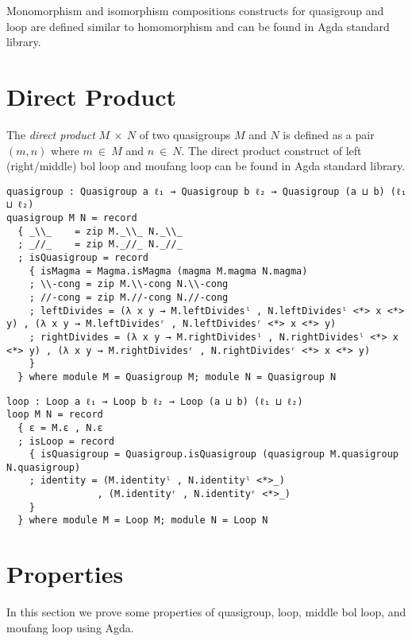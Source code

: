 Monomorphism and isomorphism compositions constructs for quasigroup and loop are
defined similar to homomorphism and can be found in Agda standard library.

\section{Direct Product}
The \textit{direct product} $M \ \times \ N$ of two quasigroups $M$ and $N$ is
defined as a pair $(m,n)$ where $m \ \in \ M$ and $n \ \in \ N$. The direct
product construct of left (right/middle) bol loop and moufang loop can be found
in Agda standard library.
\begin{verbatim}
quasigroup : Quasigroup a ℓ₁ → Quasigroup b ℓ₂ → Quasigroup (a ⊔ b) (ℓ₁ ⊔ ℓ₂)
quasigroup M N = record
  { _\\_    = zip M._\\_ N._\\_
  ; _//_    = zip M._//_ N._//_
  ; isQuasigroup = record
    { isMagma = Magma.isMagma (magma M.magma N.magma)
    ; \\-cong = zip M.\\-cong N.\\-cong
    ; //-cong = zip M.//-cong N.//-cong
    ; leftDivides = (λ x y → M.leftDividesˡ , N.leftDividesˡ <*> x <*> y) , (λ x y → M.leftDividesʳ , N.leftDividesʳ <*> x <*> y)
    ; rightDivides = (λ x y → M.rightDividesˡ , N.rightDividesˡ <*> x <*> y) , (λ x y → M.rightDividesʳ , N.rightDividesʳ <*> x <*> y)
    }
  } where module M = Quasigroup M; module N = Quasigroup N
\end{verbatim}
\begin{verbatim}
loop : Loop a ℓ₁ → Loop b ℓ₂ → Loop (a ⊔ b) (ℓ₁ ⊔ ℓ₂)
loop M N = record
  { ε = M.ε , N.ε
  ; isLoop = record
    { isQuasigroup = Quasigroup.isQuasigroup (quasigroup M.quasigroup N.quasigroup)
    ; identity = (M.identityˡ , N.identityˡ <*>_)
                , (M.identityʳ , N.identityʳ <*>_)
    }
  } where module M = Loop M; module N = Loop N
\end{verbatim}

\section{Properties}
In this section we prove some properties of quasigroup, loop, middle bol loop, and moufang loop using
Agda.
